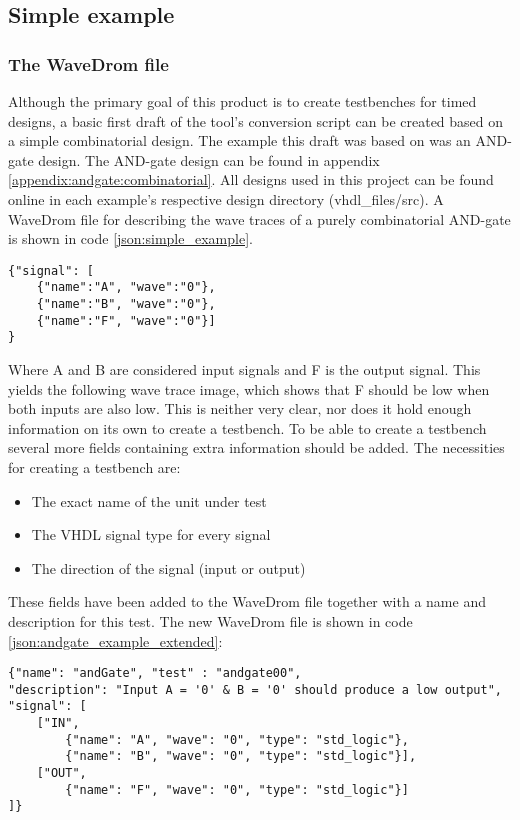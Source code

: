 \subsection{Simple example}
\subsubsection{The WaveDrom file}
Although the primary goal of this product is to create testbenches for timed designs, a basic first draft of the tool's conversion script can be created based on a simple combinatorial design.
\npar
The example this draft was based on was an AND-gate design. The AND-gate design can be found in appendix \ref{appendix:andgate:combinatorial}. All designs used in this project can be found online \cite{examples} in each example's respective design directory (vhdl\_files/src).
\npar
A WaveDrom file for describing the wave traces of a purely combinatorial AND-gate is shown in code \ref{json:simple_example}.
\begin{lstlisting}[style=json, caption={Standard WaveDrom description for a combinatorial AND-gate}, label={json:simple_example}]
{"signal": [
	{"name":"A", "wave":"0"},
	{"name":"B", "wave":"0"},
	{"name":"F", "wave":"0"}]  
}
\end{lstlisting}\noindent
Where A and B are considered input signals and F is the output signal. This yields the following wave trace image, which shows that F should be low when both inputs are also low.%
\nline
This is neither very clear, nor does it hold enough information on its own to create a testbench.
To be able to create a testbench several more fields containing extra information should be added.
\npar
The necessities for creating a testbench are:
\begin{itemize}
	\item The exact name of the unit under test
	\item The VHDL signal type for every signal
	\item The direction of the signal (input or output)
\end{itemize}\noindent
These fields have been added to the WaveDrom file together with a name and description for this test. The new WaveDrom file is shown in code \ref{json:andgate_example_extended}:\newpage
\begin{lstlisting}[style=json, caption={Extended WaveDrom description for a combinatorial AND-gate}, label={json:andgate_example_extended}]
{"name": "andGate", "test" : "andgate00", 
"description": "Input A = '0' & B = '0' should produce a low output", 
"signal": [
	["IN",
		{"name": "A", "wave": "0", "type": "std_logic"},
		{"name": "B", "wave": "0", "type": "std_logic"}],
	["OUT",
		{"name": "F", "wave": "0", "type": "std_logic"}]
]}
\end{lstlisting}\noindent
